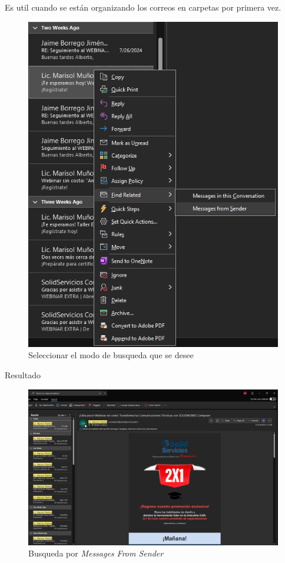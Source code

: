 \documentclass[12pt,letterpaper,final]{report}
\begin{document}
Es util cuando se están organizando los correos en carpetas por primera vez.

\begin{figure}[H]
	\centering
	\includegraphics[width=0.65\linewidth, height=0.45\textheight,keepaspectratio]{Imagenes/outlook_findrelated01}
	\caption{Seleccionar el modo de busqueda que se desee}
	\label{fig:outlookfindrelated01}
\end{figure}

\pagebreak

{\LARGE Resultado}

\begin{figure}[H]
	\centering
	\includegraphics[width=0.95\linewidth, height=0.55\textheight,keepaspectratio]{Imagenes/outlook_findrelated02}
	\caption{Busqueda por \emph{Messages From Sender}}
	\label{fig:outlookfindrelated02}
\end{figure}
\end{document}
